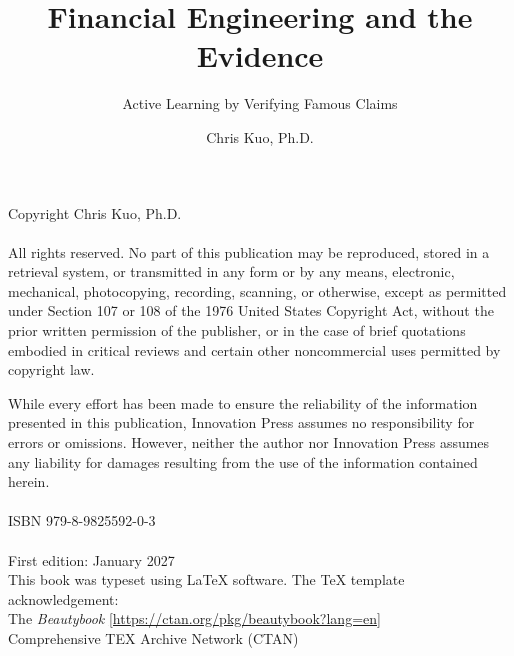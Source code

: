 \documentclass[12pt]{Beautybook-EN}
\begin{document}
\thispagestyle{empty}
\title{Financial Engineering and the Evidence}
\subtitle{Active Learning by Verifying Famous Claims}
\author{Chris Kuo, Ph.D.}
\makeatletter





\newpage
\vspace*{\fill}
\footnotesize
\noindent Copyright \textcopyright{} Chris Kuo, Ph.D. \\
\\
\noindent  All rights reserved. No part of this publication may be reproduced, stored in a retrieval system, or transmitted in any form or by any means, electronic, mechanical, photocopying, recording, scanning, or otherwise, except as permitted under Section 107 or 108 of the 1976 United States Copyright Act, without the prior written permission of the publisher, or in the case of brief quotations embodied in critical reviews and certain other noncommercial uses permitted by copyright law. 

\noindent  
While every effort has been made to ensure the reliability of the information presented in this publication, Innovation Press assumes no responsibility for errors or omissions. However, neither the author nor Innovation Press assumes any liability for damages resulting from the use of the information contained herein. \\
\\


 \noindent  ISBN 979-8-9825592-0-3
 \\
 \\
\noindent First edition:  January 2027 \\

\noindent This book was typeset using \LaTeX{} software. 
The  \TeX{}  template acknowledgement:  \\
 The \textit{Beautybook} \url{[https://ctan.org/pkg/beautybook?lang=en]} \\
Comprehensive TEX Archive Network (CTAN)\\
\\
\end{document}
